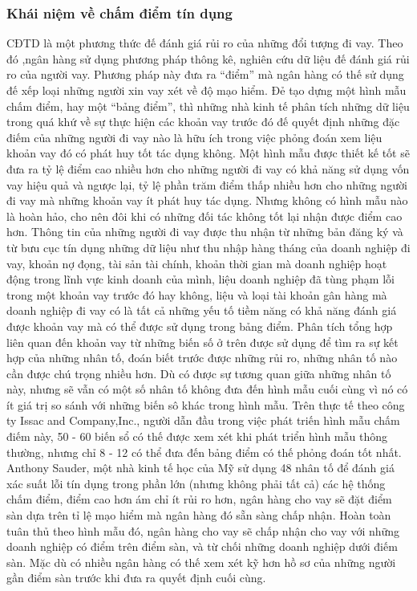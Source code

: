 \subsubsection{Khái niệm về chấm điểm tín dụng}
CĐTD là một phương thức đế đánh giá rủi ro của những đổi tượng đi vay. 
Theo đó ,ngân hàng sử dụng phương pháp thông kê, nghiên cứu dữ liệu đế đánh giá rủi ro của người vay. 
Phương pháp này đưa ra “điểm” mà ngân hàng có thế sử dụng đế xếp loại những người xin vay xét về độ mạo hiểm. Đẻ tạo dựng một hình mẫu chấm điểm, hay một “bảng điểm”, thì những nhà kinh tế phân tích những dữ liệu trong quá khứ về sự thực hiện các khoản vay trước đó đế quyết định những đặc điếm của những người đi vay nào là hữu ích trong việc phỏng đoán xem liệu khoản vay đó có phát huy tốt tác dụng không. Một hình mẫu được thiết kế tốt sẽ đưa ra tỷ lệ điểm cao nhiều hơn cho những người đi vay có khả năng sử dụng vốn vay hiệu quả và ngược lại, tỷ lệ phần trăm điểm thấp nhiều hơn cho những người đi vay mà những khoản vay ít phát huy tác dụng. Nhưng không có hình mẫu nào là hoàn hảo, cho nên đôi khi có những đối tác không tốt lại nhận được điểm cao hơn. Thông tin của những người đi vay được thu nhận từ những bản đăng ký và từ bưu cục tín dụng những dữ liệu như thu nhập hàng tháng của doanh nghiệp đi vay, khoản nợ đọng, tài sản tài chính, khoản thời gian mà doanh nghiệp hoạt động trong lĩnh vực kinh doanh của mình, liệu doanh nghiệp đã tùng phạm lỗi trong một khoản vay trước đó hay không, liệu và loại tài khoản gân hàng mà doanh nghiệp đi vay có là tất cả những yếu tố tiềm năng có khả năng đánh giá được khoản vay mà có thể được sử dụng trong bảng điểm. Phân tích tổng hợp liên quan đến khoản vay từ những biến số ở trên được sử dụng để tìm ra sự kết hợp của những nhân tố, đoán biết trước được những rủi ro, những nhân tố nào cần được chú trọng nhiều hơn. Dù có được sự tương quan giữa những nhân tố này, nhưng sẽ vẫn có một số nhân tố không đưa đến hình mẫu cuối cùng vì nó có ít giá trị so sánh với những biến sô khác trong hình mẫu. Trên thực tế theo công ty Issac and Company,Inc., người dẫn đầu trong việc phát triến hình mẫu chấm điếm này, 50 - 60 biến sổ có thế được xem xét khi phát triển hình mẫu thông thường, nhưng chỉ 8 - 12 có thể đưa đến bảng điểm có thế phỏng đoán tốt nhất. Anthony Sauder, một nhà kinh tế học của Mỹ sử dụng 48 nhân tố để đánh giá xác suất lỗi tín dụng trong phần lớn (nhưng không phải tất cả) các hệ thống chấm điểm, điểm cao hơn ám chỉ ít rủi ro hơn, ngân hàng cho vay sẽ đặt điểm sàn dựa trên tỉ lệ mạo hiểm mà ngân hàng đó sẵn sàng chấp nhận. Hoàn toàn tuân thủ theo hình mẫu đó, ngân hàng cho vay sẽ chấp nhận cho vay với những doanh nghiệp có điểm trên điểm sàn, và từ chối những doanh nghiệp dưới điếm sàn. Mặc dù có nhiều ngân hàng có thế xem xét kỹ hơn hồ sơ của những người gần điểm sàn trước khi đưa ra quyết định cuối cùng. 

